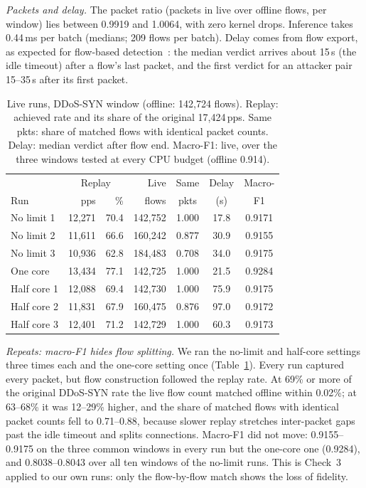 \emph{Packets and delay.} The packet ratio (packets in live over offline flows, per window) lies between 0.9919 and 1.0064, with zero kernel drops. Inference takes 0.44\,ms per batch (medians; 209 flows per batch). Delay comes from flow export, as expected for flow-based detection~\cite{hofstede2013realtime}: the median verdict arrives about 15\,s (the idle timeout) after a flow's last packet, and the first verdict for an attacker pair 15--35\,s after its first packet.

\begin{table}[t]
\centering
\caption{Live runs, DDoS-SYN window (offline: 142,724 flows). Replay: achieved rate and its share of the original 17,424\,pps. Same pkts: share of matched flows with identical packet counts. Delay: median verdict after flow end. Macro-F1: live, over the three windows tested at every CPU budget (offline 0.914).}
\label{tab:repeats}
\footnotesize
\setlength{\tabcolsep}{2.5pt}
\begin{tabular}{lrrrccc}
\hline
 & \multicolumn{2}{c}{Replay} & Live & Same & Delay & Macro- \\
Run & pps & \% & flows & pkts & (s) & F1 \\
\hline
No limit 1  & 12,271 & 70.4 & 142,752 & 1.000 & 17.8 & 0.9171 \\
No limit 2  & 11,611 & 66.6 & 160,242 & 0.877 & 30.9 & 0.9155 \\
No limit 3  & 10,936 & 62.8 & 184,483 & 0.708 & 34.0 & 0.9175 \\
One core    & 13,434 & 77.1 & 142,725 & 1.000 & 21.5 & 0.9284 \\
Half core 1 & 12,088 & 69.4 & 142,730 & 1.000 & 75.9 & 0.9175 \\
Half core 2 & 11,831 & 67.9 & 160,475 & 0.876 & 97.0 & 0.9172 \\
Half core 3 & 12,401 & 71.2 & 142,729 & 1.000 & 60.3 & 0.9173 \\
\hline
\end{tabular}
\end{table}

\emph{Repeats: macro-F1 hides flow splitting.} We ran the no-limit and half-core settings three times each and the one-core setting once (Table~\ref{tab:repeats}). Every run captured every packet, but flow construction followed the replay rate. At 69\% or more of the original DDoS-SYN rate the live flow count matched offline within 0.02\%; at 63--68\% it was 12--29\% higher, and the share of matched flows with identical packet counts fell to 0.71--0.88, because slower replay stretches inter-packet gaps past the idle timeout and splits connections. Macro-F1 did not move: 0.9155--0.9175 on the three common windows in every run but the one-core one (0.9284), and 0.8038--0.8043 over all ten windows of the no-limit runs. This is Check~3 applied to our own runs: only the flow-by-flow match shows the loss of fidelity.

